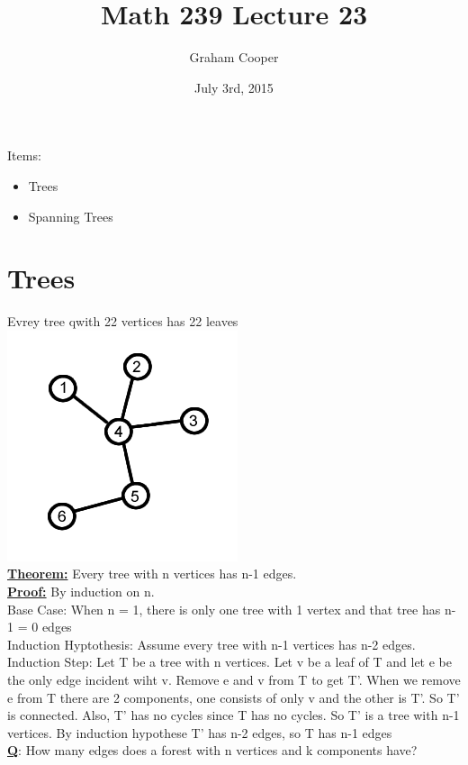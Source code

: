 \documentclass[12pt]{article}
\title{\vspace{-15ex}Math 239 Lecture 23\vspace{-1ex}}
\date{July 3rd, 2015}
\author{Graham Cooper}
\newcommand{\myt}[1]{\textbf{\underline{#1}}}
\begin{document}
	\maketitle
	Items:
	\begin{itemize}
		\item Trees
		\item Spanning Trees
	\end{itemize}
	
	\section*{Trees}
	Evrey tree qwith 22 vertices has 22 leaves\\
	\includegraphics[scale=0.5]{tinytree.png}\\
	
	\myt{Theorem:} Every tree with n vertices has n-1 edges.\\
	
	\myt{Proof:} By induction on n.\\
	Base Case: When n = 1, there is only one tree with 1 vertex and that tree has n-1 = 0 edges\\
	
	Induction Hyptothesis: Assume every tree with n-1 vertices has n-2 edges.\\
	
	Induction Step: Let T be a tree with n vertices. Let v be a leaf of T and let e be the only edge incident wiht v. Remove e and v from T to get T'. When we remove e from T there are 2 components, one consists of only v and the other is T'. So T' is connected. Also, T' has no cycles since T has no cycles. So T' is a tree with n-1 vertices. By induction hypothese T' has n-2 edges, so T has n-1 edges\\
	
	\myt{Q}: How many edges does a forest with n vertices and k components have?
	
\end{document}
